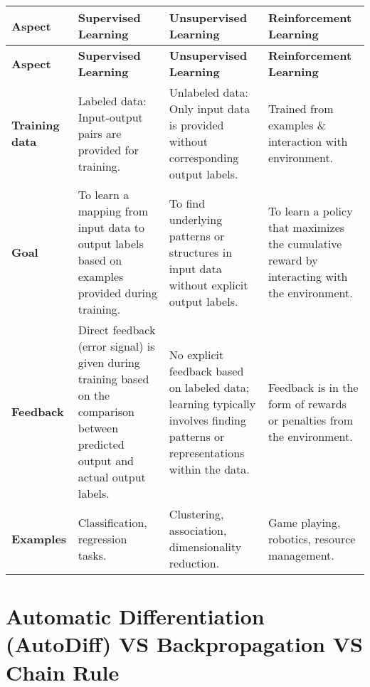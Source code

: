 \begin{longtable}{|p{1.6cm}|p{4.5cm}|p{4.5cm}|p{4.5cm}|}
    \hline
    \textbf{Aspect} & \textbf{Supervised Learning} & \textbf{Unsupervised Learning} & \textbf{Reinforcement Learning} \\
    \hline
    \endfirsthead

    \hline
    \textbf{Aspect} & \textbf{Supervised Learning} & \textbf{Unsupervised Learning} & \textbf{Reinforcement Learning} \\
    \hline
    \endhead
    
    \hline\endfoot
    \hline\endlastfoot
    
    \textbf{Training data} & Labeled data: Input-output pairs are provided for training. & Unlabeled data: Only input data is provided without corresponding output labels. & Trained from examples \& interaction with environment. \\
    \hline
    \textbf{Goal} & To learn a mapping from input data to output labels based on examples provided during training. & To find underlying patterns or structures in input data without explicit output labels. & To learn a policy that maximizes the cumulative reward by interacting with the environment. \\
    \hline
    \textbf{Feedback} & Direct feedback (error signal) is given during training based on the comparison between predicted output and actual output labels. & No explicit feedback based on labeled data; learning typically involves finding patterns or representations within the data. & Feedback is in the form of rewards or penalties from the environment. \\
    \hline
    \textbf{Examples} & Classification, regression tasks. & Clustering, association, dimensionality reduction. & Game playing, robotics, resource management. \\
    \hline
\end{longtable}


\section{Automatic Differentiation (AutoDiff) VS Backpropagation VS Chain Rule \cite{chatgpt}}\label{Automatic Differentiation (AutoDiff) VS Backpropagation VS Chain Rule}

